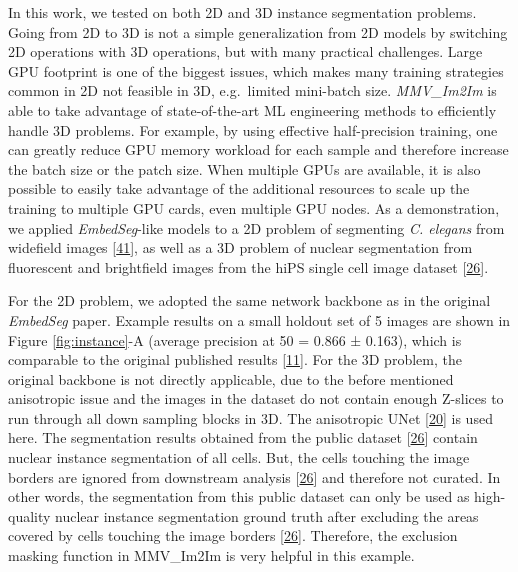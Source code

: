 In this work, we tested on both 2D and 3D instance segmentation problems. Going from 2D to 3D is not a simple generalization from 2D models by switching 2D operations with 3D operations, but with many practical challenges. Large GPU footprint is one of the biggest issues, which makes many training strategies common in 2D not feasible in 3D, e.g.~limited mini-batch size. \emph{MMV\_Im2Im} is able to take advantage of state-of-the-art ML engineering methods to efficiently handle 3D problems. For example, by using effective half-precision training, one can greatly reduce GPU memory workload for each sample and therefore increase the batch size or the patch size. When multiple GPUs are available, it is also possible to easily take advantage of the additional resources to scale up the training to multiple GPU cards, even multiple GPU nodes. As a demonstration, we applied \emph{EmbedSeg}-like models to a 2D problem of segmenting \emph{C. elegans} from widefield images {[}\protect\hyperlink{ref-138foKNOh}{41}{]}, as well as a 3D problem of nuclear segmentation from fluorescent and brightfield images from the hiPS single cell image dataset {[}\protect\hyperlink{ref-5sGcmDuy}{26}{]}.

For the 2D problem, we adopted the same network backbone as in the original \emph{EmbedSeg} paper. Example results on a small holdout set of 5 images are shown in Figure \ref{fig:instance}-A (average precision at 50 = 0.866 ± 0.163), which is comparable to the original published results {[}\protect\hyperlink{ref-QmYuUQ5K}{11}{]}. For the 3D problem, the original backbone is not directly applicable, due to the before mentioned anisotropic issue and the images in the dataset do not contain enough Z-slices to run through all down sampling blocks in 3D. The anisotropic UNet {[}\protect\hyperlink{ref-jM3v1UjQ}{20}{]} is used here. The segmentation results obtained from the public dataset {[}\protect\hyperlink{ref-5sGcmDuy}{26}{]} contain nuclear instance segmentation of all cells. But, the cells touching the image borders are ignored from downstream analysis {[}\protect\hyperlink{ref-5sGcmDuy}{26}{]} and therefore not curated. In other words, the segmentation from this public dataset can only be used as high-quality nuclear instance segmentation ground truth after excluding the areas covered by cells touching the image borders {[}\protect\hyperlink{ref-5sGcmDuy}{26}{]}. Therefore, the exclusion masking function in MMV\_Im2Im is very helpful in this example.

